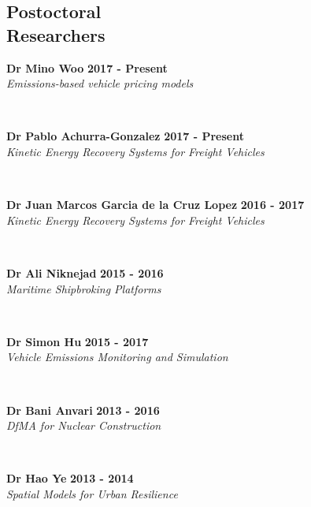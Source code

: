 \documentclass[margin]{res}
\newcommand\tab[1][1cm]{\hspace*{#1}}
\begin{document}
\begin{resume}
\section{\sc Postoctoral\\ Researchers}
	\vspace{0.03in}
	\begin{minipage}{\textwidth}
	{\bf Dr Mino Woo} \hfill {\bf 2017 - Present} \\
	\tab[0.2in] \textit{Emissions-based vehicle pricing models}
	\end{minipage}
	\\
	\vspace{0.03in}
	\begin{minipage}{\textwidth}
	{\bf Dr Pablo Achurra-Gonzalez} \hfill {\bf 2017 - Present} \\
	\tab[0.2in] \textit{Kinetic Energy Recovery Systems for Freight Vehicles}
	\end{minipage}
	\\
	\vspace{0.03in}
	\begin{minipage}{\textwidth}
	{\bf Dr Juan Marcos Garcia de la Cruz Lopez} \hfill {\bf 2016 - 2017} \\
	\tab[0.2in] \textit{Kinetic Energy Recovery Systems for Freight Vehicles}
	\end{minipage}
	\\
	\vspace{0.03in}
	\begin{minipage}{\textwidth}
	{\bf Dr Ali Niknejad} \hfill {\bf 2015 - 2016} \\
	\tab[0.2in] \textit{Maritime Shipbroking Platforms}
	\end{minipage}
	\\
	\vspace{0.03in}
	\begin{minipage}{\textwidth}
	{\bf Dr Simon Hu} \hfill {\bf 2015 - 2017} \\
	\tab[0.2in] \textit{Vehicle Emissions Monitoring and Simulation}
	\end{minipage}
	\\
	\vspace{0.03in}
	\begin{minipage}{\textwidth}
	{\bf Dr Bani Anvari} \hfill {\bf 2013 - 2016} \\
	\tab[0.2in] \textit{DfMA for Nuclear Construction}
	\end{minipage}
	\\
	\vspace{0.03in}
	\begin{minipage}{\textwidth}
	{\bf Dr Hao Ye} \hfill {\bf 2013 - 2014} \\
	\tab[0.2in] \textit{Spatial Models for Urban Resilience}
	\end{minipage}
	\\


\end{resume}
\end{document}
